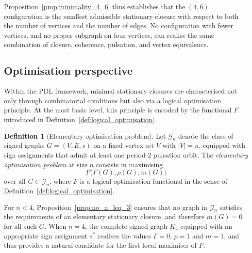 \documentclass[11pt,a4paper]{article}
\theoremstyle{definition}
\newtheorem{definition}[theorem]{Definition}
\begin{document}
Proposition~\ref{prop:minimality_4_6} thus establishes that the $(4,6)$ configuration is the smallest admissible stationary closure with respect to both the number of vertices and the number of edges. No configuration with fewer vertices, and no proper subgraph on four vertices, can realise the same combination of closure, coherence, pulsation, and vertex equivalence.\cite{PDL_Main_2026,PDL_Global_Mapping_2026}

\subsection{Optimisation perspective}

Within the PDL framework, minimal stationary closures are characterised not only through combinatorial conditions but also via a logical optimisation principle. At the most basic level, this principle is encoded by the functional $F$ introduced in Definition~\ref{def:logical_optimisation}.\cite{PDL_Intro_2026,PDL_Main_2026}

\begin{definition}[Elementary optimisation problem]
\label{def:elementary_optimisation}
Let $\mathcal{G}_n$ denote the class of signed graphs $G=(V,E,s)$ on a fixed vertex set $V$ with $|V|=n$, equipped with sign assignments that admit at least one period-$2$ pulsation orbit. The \emph{elementary optimisation problem} at size $n$ consists in maximising
\[
 F\bigl(\Gamma(G),\rho(G),m(G)\bigr)
\]
over all $G\in \mathcal{G}_n$, where $F$ is a logical optimisation functional in the sense of Definition~\ref{def:logical_optimisation}.
\end{definition}

For $n<4$, Proposition~\ref{prop:no_n_leq_3} ensures that no graph in $\mathcal{G}_n$ satisfies the requirements of an elementary stationary closure, and therefore $m(G)=0$ for all such $G$.\cite{PDL_Main_2026} When $n=4$, the complete signed graph $K_4$ equipped with an appropriate sign assignment $s^\ast$ realises the values $\Gamma=0$, $\rho=1$ and $m=1$, and thus provides a natural candidate for the first local maximiser of $F$.\cite{PDL_Main_2026,PDL_Global_Mapping_2026}
\end{document}
